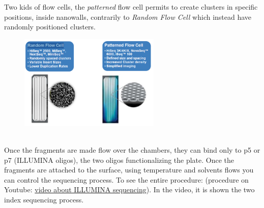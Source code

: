 Two kids of flow cells, the \textit{patterned} flow cell permits to create clusters in specific positions, inside nanowalls, contrarily to \textit{Random Flow Cell} which instead have randomly positioned clusters. 
\begin{figure}[h]
\caption{}
\centering
\includegraphics[width=0.6\textwidth]{randomPatternCells}
\label{}
\end{figure}
\\

Once the fragments are made flow over the chambers, they can bind only to p5 or p7 (ILLUMINA oligos), the two oligos functionalizing the plate. Once the fragments are attached to the surface, using temperature and solvents flows you can control the sequencing process. To see the entire procedure: 
(procedure on Youtube: \href{https://www.youtube.com/watch?v=womKfikWlxM}{video about ILLUMINA sequencing}). In the video, it is shown the two index sequencing process. 
\\
\\


